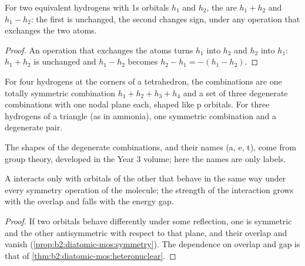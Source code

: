 \begin{proposition}\label{prop:b2:fragment-orbitals:h2-pair}
For two equivalent hydrogens with 1s orbitals $h_1$ and $h_2$, the
 are $h_1 + h_2$ and $h_1 - h_2$: the first is
unchanged, the second changes sign, under any operation that exchanges the two
atoms.
\end{proposition}

\begin{proof}
An operation that exchanges the atoms turns $h_1$ into $h_2$ and $h_2$ into
$h_1$: $h_1 + h_2$ is unchanged and $h_1 - h_2$ becomes $h_2 - h_1 = -(h_1 - h_2)$.
\end{proof}

\begin{proposition}\label{prop:b2:fragment-orbitals:h4}
For four hydrogens at the corners of a tetrahedron, the combinations are one
totally symmetric combination $h_1 + h_2 + h_3 + h_4$ and a set of three degenerate
combinations with one nodal plane each, shaped like p orbitals. For three
hydrogens of a triangle (as in ammonia), one symmetric combination and a
degenerate pair.
\end{proposition}

\admitted

The shapes of the degenerate combinations, and their names (a, e, t), come from
group theory, developed in the Year 3 volume; here the names are only labels.

\begin{proposition}\label{prop:b2:fragment-orbitals:interaction-rules}
A  interacts only with orbitals of the other  that
behave in the same way under every symmetry operation of the molecule; the
strength of the interaction grows with the overlap and falls with the energy
gap.
\end{proposition}

\begin{proof}
If two orbitals behave differently under some reflection, one is symmetric and
the other antisymmetric with respect to that plane, and their overlap and
 vanish (\cref{prop:b2:diatomic-mos:symmetry}). The dependence on
overlap and gap is that of \cref{thm:b2:diatomic-mos:heteronuclear}.
\end{proof}

